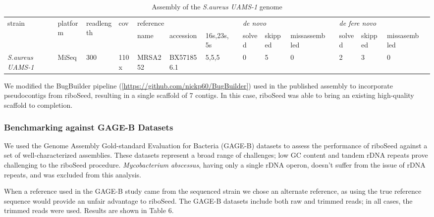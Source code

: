 \documentclass[11pt]{article}
\begin{document}
\begin{linenumbers}
\begin{table}[]
\centering
\caption{Assembly of the \textit{S.aureus UAMS-1} genome}
\label{U1}
\begin{tabular}{llllllllllllllll}
  \hline
  \multirow{2}{*}{strain} & \multirow{2}{*}{platform} & \multirow{2}{*}{readlength} & \multirow{2}{*}{cov} & \multicolumn{3}{l}{reference} &  & \multicolumn{3}{l}{\textit{de novo}} &  & \multicolumn{3}{l}{\textit{de fere novo}} &  \\
  \cline{5-7} \cline{9-11} \cline{13-15} &  &  &  & name & accession & 16s,23s,5s &  & solved & skipped & missassembled &  & solved & skipped & missasembled &  \\
  \hline
  \textit{S.aureus UAMS-1} & MiSeq & 300 & 110x & MRSA252 & BX571856.1 & 5,5,5 &  & 0 & 5 & 0 &  & 2 & 3 & 0 &
\end{tabular}
\end{table}


We modified the BugBuilder pipeline (\ref{https://github.com/nickp60/BugBuilder}) used in the published assembly to incorporate pseudocontigs from riboSeed, resulting in a single scaffold of 7 contigs. In this case, riboSeed was able to bring an existing high-quality scaffold to completion.

\subsubsection*{Benchmarking against GAGE-B Datasets}
We used the Genome Assembly Gold-standard Evaluation for Bacteria (GAGE-B) datasets \cite{Magoc2013} to assess the performance of riboSeed against a set of well-characterized assemblies. These datasets represent a broad range of challenges; low GC content and tandem rDNA repeats prove challenging to the riboSeed procedure. \textit{Mycobacterium abscessus}, having only a single rDNA operon, doesn’t suffer from the issue of rDNA repeats, and was excluded from this analysis.


When a reference used in the GAGE-B study came from the sequenced strain we chose an alternate reference, as using the true reference sequence would provide an unfair advantage to riboSeed. The GAGE-B datasets include both raw and trimmed reads; in all cases, the trimmed reads were used. Results are shown in Table 6.


\end{linenumbers}
\end{document}
